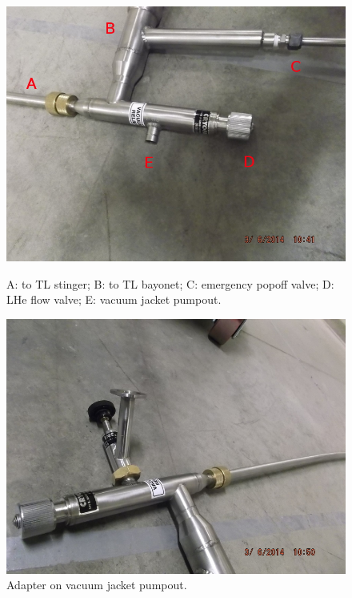 \begin{figure}[h]
 \centering
  \begin{minipage}{.45\textwidth}
 \includegraphics[width=\textwidth]{./img/cf-tl-pumpout.JPG}
 \caption{A: to TL stinger; B: to TL bayonet; C: emergency popoff valve; D: LHe flow valve; E: vacuum jacket pumpout.}
 \label{fig:cf-tl-pumpout}
 \end{minipage}
 \quad
 \begin{minipage}{.45\textwidth}
 \includegraphics[width=\textwidth]{./img/cf-adapter-on-tl.JPG}
 \caption{Adapter on vacuum jacket pumpout.}

\end{minipage}
\end{figure}
